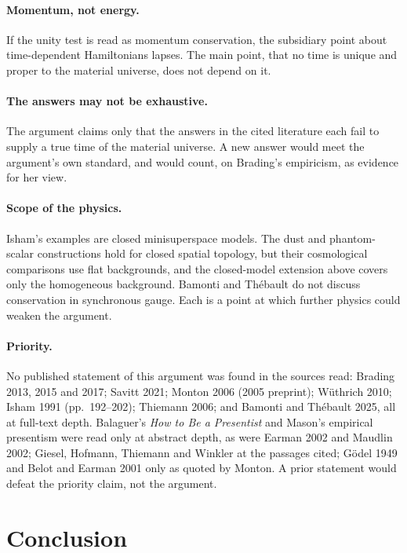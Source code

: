 \documentclass[11pt]{article}
\begin{document}
\paragraph{Momentum, not energy.} If the unity test is read as momentum
conservation, the subsidiary point about time-dependent Hamiltonians lapses. The
main point, that no time is unique and proper to the material universe, does not
depend on it.

\paragraph{The answers may not be exhaustive.} The argument claims only that the
answers in the cited literature each fail to supply a true time of the material
universe. A new answer would meet the argument's own standard, and would count, on
Brading's empiricism, as evidence for her view.

\paragraph{Scope of the physics.} Isham's examples are closed minisuperspace
models. The dust and phantom-scalar constructions hold for closed spatial
topology, but their cosmological comparisons use flat backgrounds, and the
closed-model extension above covers only the homogeneous background. Bamonti and
Thébault do not discuss conservation in synchronous gauge. Each is a point at
which further physics could weaken the argument.

\paragraph{Priority.} No published statement of this argument was found in the
sources read: Brading 2013, 2015 and 2017; Savitt 2021; Monton 2006 (2005
preprint); Wüthrich 2010; Isham 1991 (pp.~192--202); Thiemann 2006; and Bamonti
and Thébault 2025, all at full-text depth. Balaguer's \emph{How to Be a Presentist}
\citep{Balaguer2026} and Mason's empirical presentism \citep{Mason2026} were read
only at abstract depth, as were Earman 2002 and Maudlin 2002; Giesel, Hofmann,
Thiemann and Winkler \citep{GHTW2007a,GHTW2007b} at the passages cited; Gödel 1949
and Belot and Earman 2001 only as quoted by Monton. A prior statement would defeat
the priority claim, not the argument.

\section{Conclusion}\label{sec:conclusion}
\end{document}
